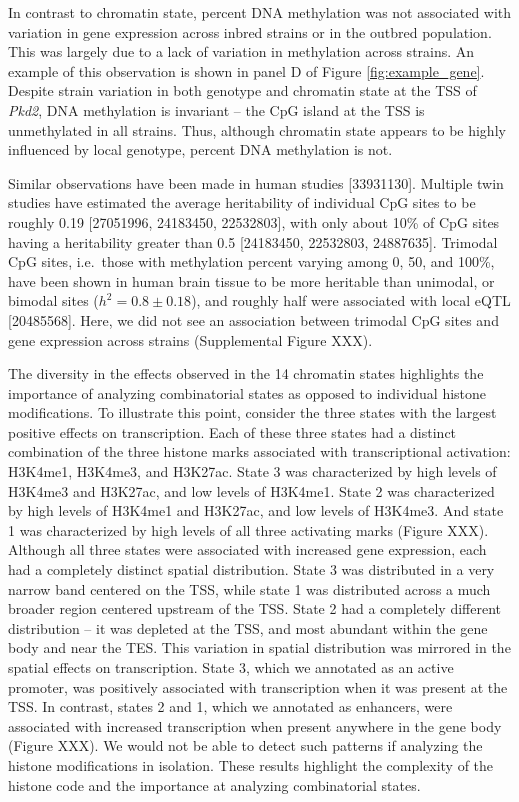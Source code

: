 \documentclass[10pt,letterpaper]{article}
\begin{document}
In contrast to chromatin state, percent DNA methylation was not
associated with variation in gene expression across inbred strains or in
the outbred population. This was largely due to a lack of variation in
methylation across strains. An example of this observation is shown in
panel D of Figure \ref{fig:example_gene}. Despite strain variation in
both genotype and chromatin state at the TSS of \textit{Pkd2}, DNA
methylation is invariant -- the CpG island at the TSS is unmethylated in
all strains. Thus, although chromatin state appears to be highly
influenced by local genotype, percent DNA methylation is not.

Similar observations have been made in human studies {[}33931130{]}.
Multiple twin studies have estimated the average heritability of
individual CpG sites to be roughly 0.19 {[}27051996, 24183450,
22532803{]}, with only about 10\% of CpG sites having a heritability
greater than 0.5 {[}24183450, 22532803, 24887635{]}. Trimodal CpG sites,
i.e.~those with methylation percent varying among 0, 50, and 100\%, have
been shown in human brain tissue to be more heritable than unimodal, or
bimodal sites (\(h^2 = 0.8 \pm 0.18\)), and roughly half were associated
with local eQTL {[}20485568{]}. Here, we did not see an association
between trimodal CpG sites and gene expression across strains
(Supplemental Figure XXX).

The diversity in the effects observed in the 14 chromatin states
highlights the importance of analyzing combinatorial states as opposed
to individual histone modifications. To illustrate this point, consider
the three states with the largest positive effects on transcription.
Each of these three states had a distinct combination of the three
histone marks associated with transcriptional activation: H3K4me1,
H3K4me3, and H3K27ac. State 3 was characterized by high levels of
H3K4me3 and H3K27ac, and low levels of H3K4me1. State 2 was
characterized by high levels of H3K4me1 and H3K27ac, and low levels of
H3K4me3. And state 1 was characterized by high levels of all three
activating marks (Figure XXX). Although all three states were associated
with increased gene expression, each had a completely distinct spatial
distribution. State 3 was distributed in a very narrow band centered on
the TSS, while state 1 was distributed across a much broader region
centered upstream of the TSS. State 2 had a completely different
distribution -- it was depleted at the TSS, and most abundant within the
gene body and near the TES. This variation in spatial distribution was
mirrored in the spatial effects on transcription. State 3, which we
annotated as an active promoter, was positively associated with
transcription when it was present at the TSS. In contrast, states 2 and
1, which we annotated as enhancers, were associated with increased
transcription when present anywhere in the gene body (Figure XXX). We
would not be able to detect such patterns if analyzing the histone
modifications in isolation. These results highlight the complexity of
the histone code and the importance at analyzing combinatorial states.
\end{document}
